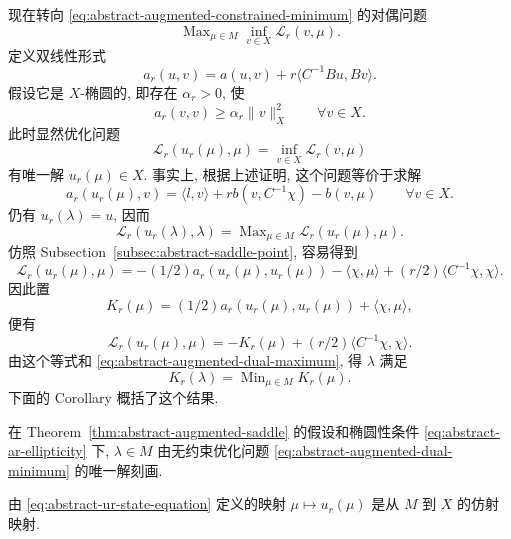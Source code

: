 现在转向 
\eqref{eq:abstract-augmented-constrained-minimum} 的对偶问题
\[
\operatorname{Max}_{\mu\in M}\inf_{v\in X}\mathcal L_r(v,\mu).
\]
定义双线性形式
\[
a_r(u,v)=a(u,v)+r\langle C^{-1}Bu,Bv\rangle.
\]
假设它是 $X$-椭圆的, 即存在 $\alpha_r>0$, 使
\begin{equation}\label{eq:abstract-ar-ellipticity}
a_r(v,v)\ge\alpha_r\|v\|_X^2
\qquad\forall v\in X.
\end{equation}
此时显然优化问题
\[
\mathcal L_r(u_r(\mu),\mu)=\inf_{v\in X}\mathcal L_r(v,\mu)
\]
有唯一解 $u_r(\mu)\in X$. 事实上, 根据上述证明, 这个问题等价于求解
\begin{equation}\label{eq:abstract-ur-state-equation}
a_r(u_r(\mu),v)=\langle l,v\rangle
+r b(v,C^{-1}\chi)-b(v,\mu)
\qquad\forall v\in X.
\end{equation}
仍有 $u_r(\lambda)=u$, 因而
\begin{equation}\label{eq:abstract-augmented-dual-maximum}
\mathcal L_r(u_r(\lambda),\lambda)
=\operatorname{Max}_{\mu\in M}\mathcal L_r(u_r(\mu),\mu).
\end{equation}
仿照 Subsection~\ref{subsec:abstract-saddle-point}, 容易得到
\[
\mathcal L_r(u_r(\mu),\mu)
=-(1/2)a_r(u_r(\mu),u_r(\mu))-\langle\chi,\mu\rangle
+(r/2)\langle C^{-1}\chi,\chi\rangle.
\]
因此置
\begin{equation}\label{eq:abstract-augmented-dual-functional}
K_r(\mu)=(1/2)a_r(u_r(\mu),u_r(\mu))+\langle\chi,\mu\rangle,
\end{equation}
便有
\[
\mathcal L_r(u_r(\mu),\mu)
=-K_r(\mu)+(r/2)\langle C^{-1}\chi,\chi\rangle.
\]
由这个等式和 
\eqref{eq:abstract-augmented-dual-maximum}, 得 $\lambda$ 满足
\begin{equation}\label{eq:abstract-augmented-dual-minimum}
K_r(\lambda)=\operatorname{Min}_{\mu\in M}K_r(\mu).
\end{equation}
下面的 Corollary 概括了这个结果.

\setcounter{statement}{2}
\begin{Corollary}\label{cor:abstract-augmented-dual-characterization}
在 Theorem~\ref{thm:abstract-augmented-saddle} 的假设和椭圆性条件
\eqref{eq:abstract-ar-ellipticity} 下, $\lambda\in M$ 由无约束优化问题
\eqref{eq:abstract-augmented-dual-minimum} 的唯一解刻画.
\end{Corollary}

\setcounter{statement}{4}
\begin{Remark}\label{rem:abstract-ur-affine}
由 
\eqref{eq:abstract-ur-state-equation} 定义的映射
$\mu\mapsto u_r(\mu)$ 是从 $M$ 到 $X$ 的仿射映射.
\end{Remark}

